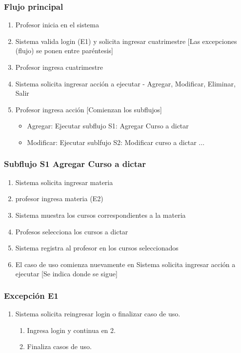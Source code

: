 \documentclass[titlepage,a4paper]{article}
\begin{document}
\subsubsection*{Flujo principal}
\begin{enumerate}
    \item Profesor inicia en el sistema
    \item Sistema valida login (E1) y solicita ingresar cuatrimestre   [Las excepciones (flujo) se ponen entre paréntesis]
    \item Profesor ingresa cuatrimestre
    \item Sistema solicita ingresar acción a ejecutar - Agregar, Modificar, Eliminar, Salir
    \item Profesor ingresa acción
    [Comienzan los subflujos]
    \begin{itemize}
        \item Agregar: Ejecutar subflujo S1: Agregar Curso a dictar
        \item Modificar: Ejecutar sublfujo S2: Modificar curso a dictar
        ...
    \end{itemize}
\end{enumerate}

\subsubsection*{Subflujo S1 Agregar Curso a dictar}
\begin{enumerate}
    \item Sistema solicita ingresar materia
    \item profesor ingresa materia (E2)
    \item Sistema muestra los cursos correspondientes a la materia
    \item Profesos selecciona los cursos a dictar
    \item Sistema registra al profesor en los cursos seleccionados
    \item El caso de uso comienza nuevamente en Sistema solicita ingresar acción a ejecutar    [Se indica donde se sigue]
\end{enumerate}

\subsubsection*{Excepción E1}
\begin{enumerate}
    \item Sistema solicita reingresar login o finalizar caso de uso.
    \begin{enumerate}
        \item Ingresa login y continua en 2.
        \item Finaliza casos de uso.
    \end{enumerate}
\end{enumerate}
\end{document}
